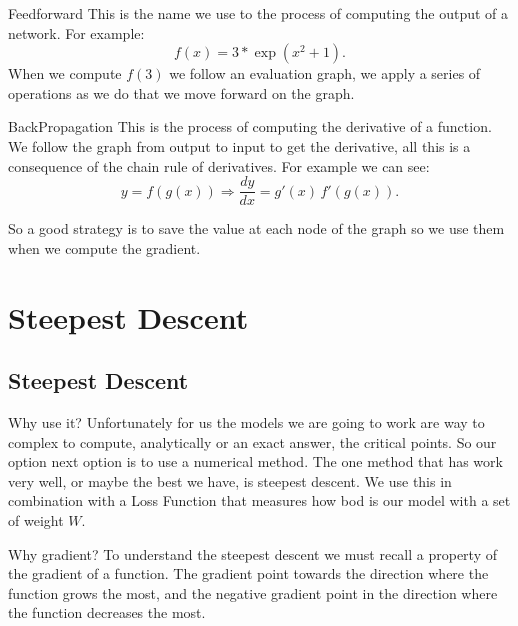 \documentclass[presentation]{beamer}
\begin{document}
\begin{frame}[label={sec:orge20d898}]{Feedforward}
This is the name we use to the process of computing the output of a network. For example:
\[
  f(x) = 3*\exp(x^2 + 1).
\]
When we compute \(f(3)\) we follow an evaluation graph, we apply a series of operations as we do that we move forward on the graph.
\end{frame}

\begin{frame}[label={sec:org97cdccc}]{BackPropagation}
This is the process of computing the derivative of a function. We follow the graph from output to input to get the derivative, all this is a consequence of the chain rule of derivatives. For example we can see:
\[
    y = f(g(x)) \Rightarrow \frac{dy}{dx} = g'(x) \, f'(g(x)).
\]

So a good strategy is to save the value at each node of the graph so we use them when we compute the gradient.
\end{frame}

\section{Steepest Descent}
\label{sec:org344073b}

\subsection{Steepest Descent}
\label{sec:orga735ef2}

\begin{frame}[label={sec:org165f5c3}]{Why use it?}
Unfortunately for us the models we are going to work are way to complex to compute, analytically or an exact answer, the critical points. So our option next option is to use a numerical method. The one method that has work very well, or maybe the best we have, is steepest descent. We use this in combination with a \alert{Loss Function} that measures how bod is our model with a set of weight \(W\).
\end{frame}

\begin{frame}[label={sec:org5f56fbf}]{Why gradient?}
To understand the steepest descent we must recall a property of the gradient of a function. The gradient point towards the direction where the function grows the most, and the negative gradient point in the direction where the function decreases the most.
\end{frame}
\end{document}
